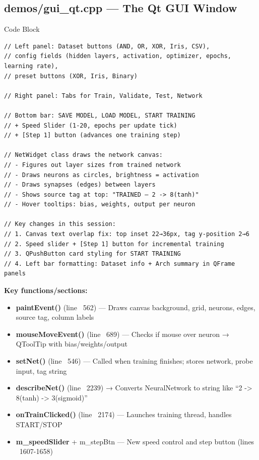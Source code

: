 \documentclass[12pt]{article}
\begin{document}
\subsection{demos/gui\_qt.cpp — The Qt GUI Window}
\begin{codebox}{Code Block}
\begin{lstlisting}
// Left panel: Dataset buttons (AND, OR, XOR, Iris, CSV),
// config fields (hidden layers, activation, optimizer, epochs, learning rate),
// preset buttons (XOR, Iris, Binary)

// Right panel: Tabs for Train, Validate, Test, Network

// Bottom bar: SAVE MODEL, LOAD MODEL, START TRAINING
// + Speed Slider (1-20, epochs per update tick)
// + [Step 1] button (advances one training step)

// NetWidget class draws the network canvas:
// - Figures out layer sizes from trained network
// - Draws neurons as circles, brightness = activation
// - Draws synapses (edges) between layers
// - Shows source tag at top: "TRAINED — 2 -> 8(tanh)"
// - Hover tooltips: bias, weights, output per neuron

// Key changes in this session:
// 1. Canvas text overlap fix: top inset 22→36px, tag y-position 2→6
// 2. Speed slider + [Step 1] button for incremental training
// 3. QPushButton card styling for START TRAINING
// 4. Left bar formatting: Dataset info + Arch summary in QFrame panels
\end{lstlisting}
\end{codebox}

\textbf{Key functions/sections:}
\begin{itemize}[leftmargin=*]
  \item \textbf{paintEvent()} (line ~562) — Draws canvas background, grid, neurons, edges, source tag, column labels
  \item \textbf{mouseMoveEvent()} (line ~689) — Checks if mouse over neuron → QToolTip with bias/weights/output
  \item \textbf{setNet()} (line ~546) — Called when training finishes; stores network, probe input, tag string
  \item \textbf{describeNet()} (line ~2239) → Converts NeuralNetwork to string like ``2 -> 8(tanh) -> 3(sigmoid)''
  \item \textbf{onTrainClicked()} (line ~2174) — Launches training thread, handles START/STOP
  \item \textbf{m\_speedSlider} + m\_stepBtn — New speed control and step button (lines ~1607-1658)
\end{itemize}
\end{document}
